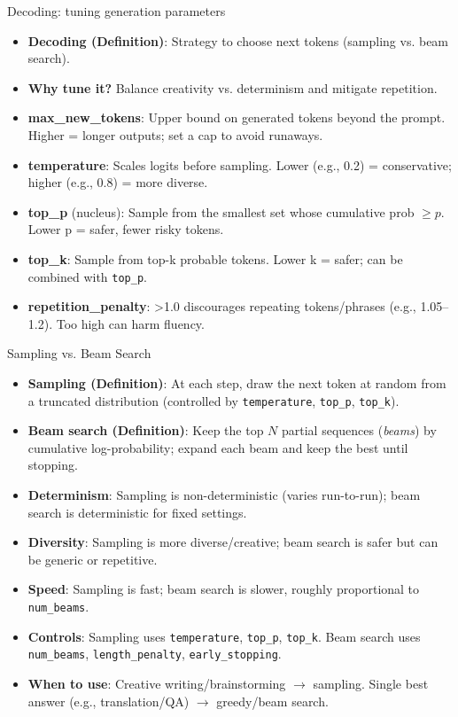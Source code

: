 \documentclass[aspectratio=169]{beamer}
\begin{document}
\begin{frame}{Decoding: tuning generation parameters}
  \begin{itemize}
    \item \textbf{Decoding (Definition)}: Strategy to choose next tokens (sampling vs. beam search).
    \item \textbf{Why tune it?} Balance creativity vs. determinism and mitigate repetition.
    \item \textbf{max\_new\_tokens}: Upper bound on generated tokens beyond the prompt. Higher = longer outputs; set a cap to avoid runaways.
    \item \textbf{temperature}: Scales logits before sampling. Lower (e.g., 0.2) = conservative; higher (e.g., 0.8) = more diverse.
    \item \textbf{top\_p} (nucleus): Sample from the smallest set whose cumulative prob \(\ge p\). Lower p = safer, fewer risky tokens.
    \item \textbf{top\_k}: Sample from top-k probable tokens. Lower k = safer; can be combined with \texttt{top\_p}.
     \item \textbf{repetition\_penalty}: >1.0 discourages repeating tokens/phrases (e.g., 1.05–1.2). Too high can harm fluency.
  \end{itemize}
\end{frame}

\begin{frame}{Sampling vs. Beam Search}
  \begin{itemize}
    \item \textbf{Sampling (Definition)}: At each step, draw the next token at random from a truncated distribution (controlled by \texttt{temperature}, \texttt{top\_p}, \texttt{top\_k}).
    \item \textbf{Beam search (Definition)}: Keep the top \(N\) partial sequences (\emph{beams}) by cumulative log-probability; expand each beam and keep the best until stopping.
    \item \textbf{Determinism}: Sampling is non-deterministic (varies run-to-run); beam search is deterministic for fixed settings.
    \item \textbf{Diversity}: Sampling is more diverse/creative; beam search is safer but can be generic or repetitive.
    \item \textbf{Speed}: Sampling is fast; beam search is slower, roughly proportional to \texttt{num\_beams}.
    \item \textbf{Controls}: Sampling uses \texttt{temperature}, \texttt{top\_p}, \texttt{top\_k}. Beam search uses \texttt{num\_beams}, \texttt{length\_penalty}, \texttt{early\_stopping}.
    \item \textbf{When to use}: Creative writing/brainstorming \(\rightarrow\) sampling. Single best answer (e.g., translation/QA) \(\rightarrow\) greedy/beam search.
  \end{itemize}
\end{frame}
\end{document}
